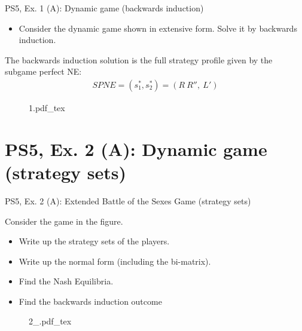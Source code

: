 \begin{frame}{PS5, Ex. 1 (A): Dynamic game (backwards induction)}
  \begin{multicols}{2}
    \begin{itemize}
      \item Consider the dynamic game shown in extensive form. Solve it by backwards induction.
    \end{itemize}
    The backwards induction solution is the full strategy profile given by the subgame perfect NE:
    \begin{align*}
      SPNE=(s_1^{*},s_2^{*})=(R\ R'',\ L')
    \end{align*}
    \vfill\null \columnbreak
    \begin{figure}[!h]
      \center
      \def\svgwidth{.8\columnwidth}
      {1.pdf_tex}
    \end{figure}
    \vfill\null
  \end{multicols}
\end{frame}



\section{PS5, Ex. 2 (A): Dynamic game (strategy sets)}

\begin{frame}{PS5, Ex. 2 (A): Extended Battle of the Sexes Game (strategy sets)}
  \begin{multicols}{2}
    Consider the game in the figure.
    \begin{itemize}
      \item[(a)] Write up the strategy sets of the players.
      \item[(b)] Write up the normal form (including the bi-matrix).
      \item[(c)] Find the Nash Equilibria.
      \item[(d)] Find the backwards induction outcome
    \end{itemize}
    \vfill\null \columnbreak
    \begin{figure}[!h]
      \center
      \def\svgwidth{\columnwidth}
      {2_.pdf_tex}
    \end{figure}
    \vfill\null
  \end{multicols}
\end{frame}

